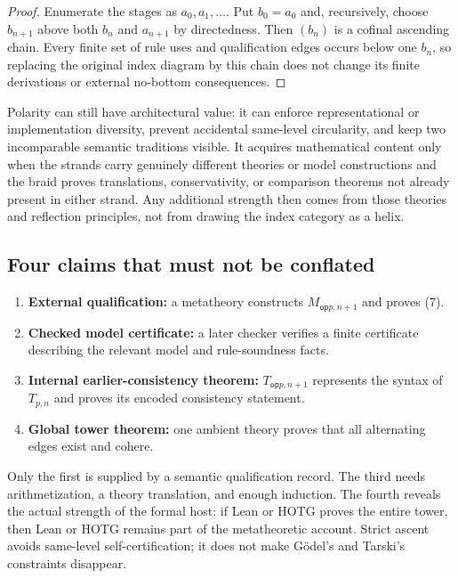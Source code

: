 \documentclass[11pt]{article}
\theoremstyle{definition}
\theoremstyle{remark}
\newcommand{\op}{\mathsf{op}}
\begin{document}
\begin{proof}
Enumerate the stages as $a_0,a_1,\ldots$.  Put $b_0=a_0$ and, recursively, choose
$b_{n+1}$ above both $b_n$ and $a_{n+1}$ by directedness.  Then $(b_n)$ is a
cofinal ascending chain.  Every finite set of rule uses and qualification edges
occurs below one $b_n$, so replacing the original index diagram by this chain
does not change its finite derivations or external no-bottom consequences.
\end{proof}

Polarity can still have architectural value: it can enforce representational or
implementation diversity, prevent accidental same-level circularity, and keep two
incomparable semantic traditions visible.  It acquires mathematical content only
when the strands carry genuinely different theories or model constructions and
the braid proves translations, conservativity, or comparison theorems not already
present in either strand.  Any additional strength then comes from those theories
and reflection principles, not from drawing the index category as a helix.

\subsection{Four claims that must not be conflated}

\begin{enumerate}
\item \textbf{External qualification:} a metatheory constructs
  $M_{\op p,n+1}$ and proves (7).
\item \textbf{Checked model certificate:} a later checker verifies a finite
  certificate describing the relevant model and rule-soundness facts.
\item \textbf{Internal earlier-consistency theorem:} $T_{\op p,n+1}$ represents
  the syntax of $T_{p,n}$ and proves its encoded consistency statement.
\item \textbf{Global tower theorem:} one ambient theory proves that all alternating
  edges exist and cohere.
\end{enumerate}

Only the first is supplied by a semantic qualification record.  The third needs
arithmetization, a theory translation, and enough induction.  The fourth reveals
the actual strength of the formal host: if Lean or HOTG proves the entire tower,
then Lean or HOTG remains part of the metatheoretic account.  Strict ascent avoids
same-level self-certification; it does not make G\"odel's and Tarski's constraints
disappear.
\end{document}
